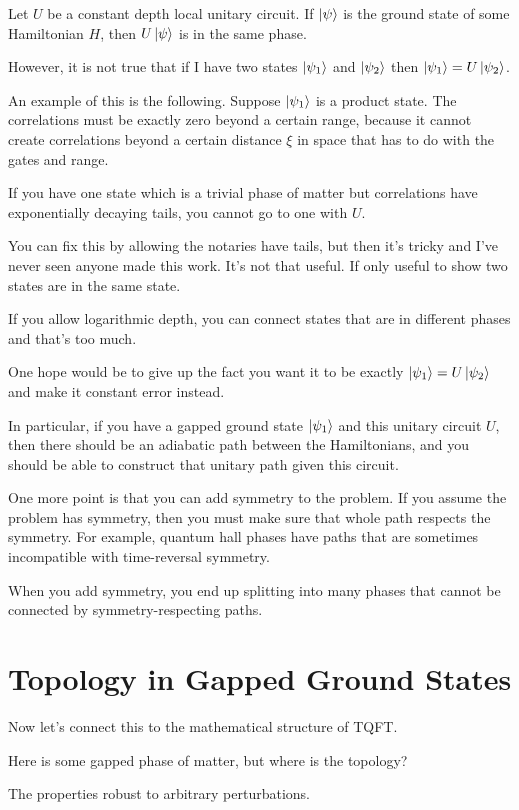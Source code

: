 Let $U$ be a constant depth local unitary circuit.
If $\ket{\psi}$ is the ground state of some Hamiltonian $H$,
then $U\ket{\psi}$ is in the same phase.

However, it is not true that if I have two states $\ket{\psi_1}$ and
$\ket{\psi_2}$ 
then $\ket{\psi_1} = U\ket{\psi_2}$.

An example of this is the following.
Suppose $\ket{\psi_1}$ is a product state.
The correlations must be exactly zero beyond a certain range,
because it cannot create correlations beyond a certain distance $\xi$ in space
that has to do with the gates and range.

If you have one state which is a trivial phase of matter
but correlations have exponentially decaying tails,
you cannot go to one with $U$.

You can fix this by allowing the notaries have tails,
but then it's tricky
and I've never seen anyone made this work.
It's not that useful.
If only useful to show two states are in the same state.

If you allow logarithmic depth,
you can connect states that are in different phases
and that's too much.

One hope would be to give up the fact you want it to be exactly
$\ket{\psi_1} = U\ket{\psi_2}$
and make it constant error instead.

In particular,
if you have a gapped ground state $\ket{\psi_1}$
and this unitary circuit $U$,
then there should be an adiabatic path between the Hamiltonians,
and you should be able to construct that unitary path
given this circuit.

One more point is that you can add symmetry to the problem.
If you assume the problem has symmetry,
then you must make sure that whole path respects the symmetry.
For example,
quantum hall phases have paths that are sometimes incompatible with
time-reversal symmetry.

When you add symmetry,
you end up splitting into many phases that cannot be connected by
symmetry-respecting paths.

\section{Topology in Gapped Ground States}
Now let's connect this to the mathematical structure of TQFT.

Here is some gapped phase of matter,
but where is the topology?

The properties robust to arbitrary perturbations.

